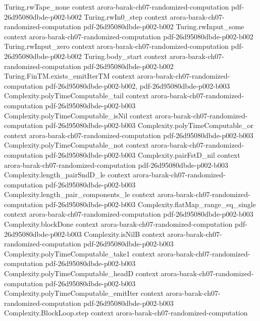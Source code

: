 \begin{theorem}
\proofstep
  {Turing.rwTape_none}
  {context}
  {arora-barak-ch07-randomized-computation}
  {pdf-26d95080dbde-p002-b002}
\proofstep
  {Turing.rwIn0_step}
  {context}
  {arora-barak-ch07-randomized-computation}
  {pdf-26d95080dbde-p002-b002}
\proofstep
  {Turing.rwInput_some}
  {context}
  {arora-barak-ch07-randomized-computation}
  {pdf-26d95080dbde-p002-b002}
\proofstep
  {Turing.rwInput_zero}
  {context}
  {arora-barak-ch07-randomized-computation}
  {pdf-26d95080dbde-p002-b002}
\proofstep
  {Turing.body_start}
  {context}
  {arora-barak-ch07-randomized-computation}
  {pdf-26d95080dbde-p002-b002}
\proofstep
  {Turing.FinTM.exists_emitIterTM}
  {context}
  {arora-barak-ch07-randomized-computation}
  {pdf-26d95080dbde-p002-b002,
    pdf-26d95080dbde-p002-b003}
\proofstep
  {Complexity.polyTimeComputable_tail}
  {context}
  {arora-barak-ch07-randomized-computation}
  {pdf-26d95080dbde-p002-b003}
\proofstep
  {Complexity.polyTimeComputable_isNil}
  {context}
  {arora-barak-ch07-randomized-computation}
  {pdf-26d95080dbde-p002-b003}
\proofstep
  {Complexity.polyTimeComputable_or}
  {context}
  {arora-barak-ch07-randomized-computation}
  {pdf-26d95080dbde-p002-b003}
\proofstep
  {Complexity.polyTimeComputable_not}
  {context}
  {arora-barak-ch07-randomized-computation}
  {pdf-26d95080dbde-p002-b003}
\proofstep
  {Complexity.pairFstD_nil}
  {context}
  {arora-barak-ch07-randomized-computation}
  {pdf-26d95080dbde-p002-b003}
\proofstep
  {Complexity.length_pairSndD_le}
  {context}
  {arora-barak-ch07-randomized-computation}
  {pdf-26d95080dbde-p002-b003}
\proofstep
  {Complexity.length_pair_components_le}
  {context}
  {arora-barak-ch07-randomized-computation}
  {pdf-26d95080dbde-p002-b003}
\proofstep
  {Complexity.flatMap_range_eq_single}
  {context}
  {arora-barak-ch07-randomized-computation}
  {pdf-26d95080dbde-p002-b003}
\proofstep
  {Complexity.blockDone}
  {context}
  {arora-barak-ch07-randomized-computation}
  {pdf-26d95080dbde-p002-b003}
\proofstep
  {Complexity.isNilB}
  {context}
  {arora-barak-ch07-randomized-computation}
  {pdf-26d95080dbde-p002-b003}
\proofstep
  {Complexity.polyTimeComputable_take1}
  {context}
  {arora-barak-ch07-randomized-computation}
  {pdf-26d95080dbde-p002-b003}
\proofstep
  {Complexity.polyTimeComputable_headD}
  {context}
  {arora-barak-ch07-randomized-computation}
  {pdf-26d95080dbde-p002-b003}
\proofstep
  {Complexity.polyTimeComputable_emitIter}
  {context}
  {arora-barak-ch07-randomized-computation}
  {pdf-26d95080dbde-p002-b003}
\proofstep
  {Complexity.BlockLoop.step}
  {context}
  {arora-barak-ch07-randomized-computation}

\end{theorem}
